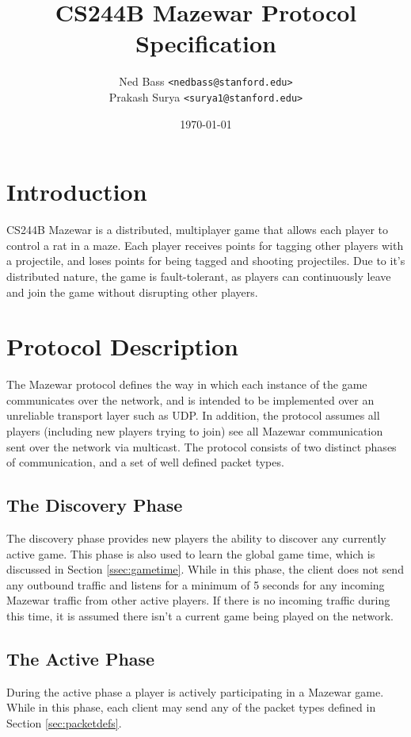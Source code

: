 \documentclass{article}
\title{CS244B Mazewar Protocol Specification}
\author{Ned Bass      \texttt{<nedbass@stanford.edu>} \\
        Prakash Surya \texttt{<surya1@stanford.edu>}}
\date{\today}
\begin{document}
\maketitle

\section{Introduction}
CS244B Mazewar is a distributed, multiplayer game that allows each
player to control a rat in a maze. Each player receives points for
tagging other players with a projectile, and loses points for being
tagged and shooting projectiles. Due to it's distributed nature, the
game is fault-tolerant, as players can continuously leave and join the
game without disrupting other players.

\section{Protocol Description}
The Mazewar protocol defines the way in which each instance of the game
communicates over the network, and is intended to be implemented over an
unreliable transport layer such as UDP. In addition, the protocol
assumes all players (including new players trying to join) see all
Mazewar communication sent over the network via multicast. The protocol
consists of two distinct phases of communication, and a set of well
defined packet types.

\subsection{The Discovery Phase}
\label{ssec:discovery}
The discovery phase provides new players the ability to discover any
currently active game.  This phase is also used to learn the global game
time, which is discussed in Section \ref{ssec:gametime}.  While in this
phase, the client does not send any outbound traffic and listens for a
minimum of 5 seconds for any incoming Mazewar traffic from other active
players. If there is no incoming traffic during this time, it is assumed
there isn't a current game being played on the network.

\subsection{The Active Phase}
During the active phase a player is actively participating in a Mazewar
game. While in this phase, each client may send any of the packet types
defined in Section \ref{sec:packetdefs}.
\end{document}
